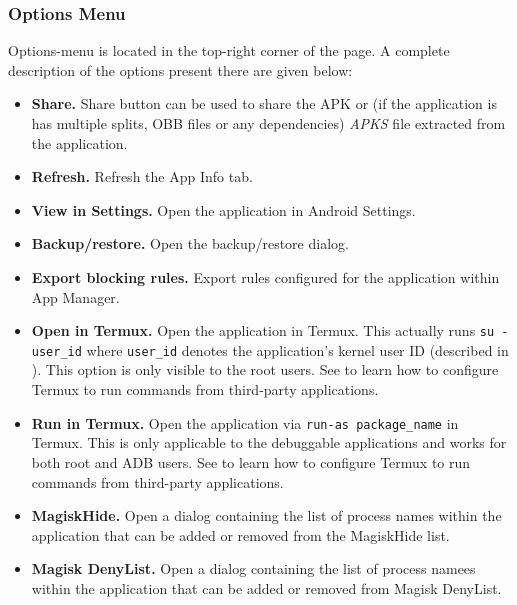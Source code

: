 \subsubsection{Options Menu}\label{subsubsec:app-info-options-menu} %
Options-menu is located in the top-right corner of the page. A complete description of the options present there are
given below:
\begin{itemize}
    \item \textbf{Share.} Share button can be used to share the APK or (if the application is has multiple splits, OBB
    files or any dependencies) \textit{APKS} file extracted from the application.

    \item \textbf{Refresh.} Refresh the App Info tab.

    \item \textbf{View in Settings.} Open the application in Android Settings.

    \item \textbf{Backup/restore.} Open the backup/restore dialog.

    \item \textbf{Export blocking rules.} Export rules configured for the application within App Manager.

    \item \textbf{Open in Termux.} Open the application in Termux. This actually runs \texttt{su - user\_id} where
    \texttt{user\_id} denotes the application's kernel user ID (described in ).
    This option is only visible to the root users. See  to learn how to configure Termux
    to run commands from third-party applications.

    \item \textbf{Run in Termux.} Open the application via \texttt{run-as package\_name} in Termux. This is only
    applicable to the debuggable applications and works for both root and ADB users. See 
    to learn how to configure Termux to run commands from third-party applications.

    \item \textbf{MagiskHide.} Open a dialog containing the list of process names within the application that can be added
    or removed from the MagiskHide list.

    \item \textbf{Magisk DenyList.} Open a dialog containing the list of process namees within the application that can be
    added or removed from Magisk DenyList.


\end{itemize}
